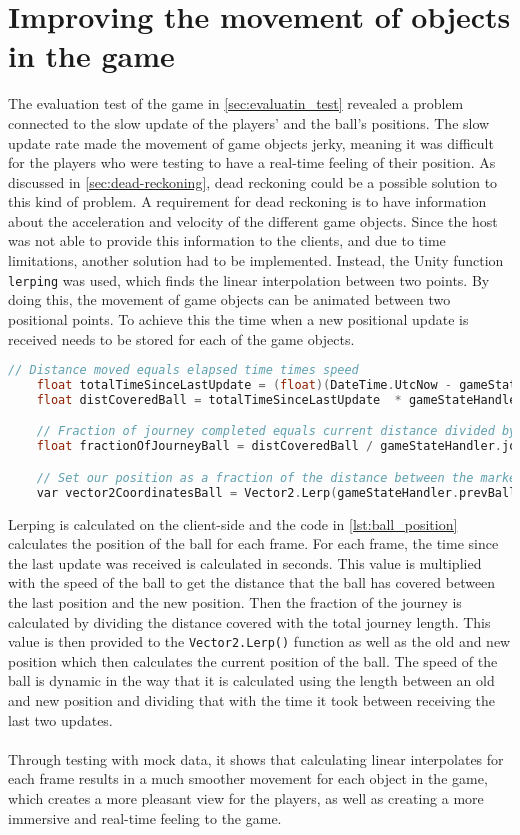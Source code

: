 \section{Improving the movement of objects in the game}\label{sec:lerping}
The evaluation test of the game in \autoref{sec:evaluatin_test} revealed a problem connected to the slow update of the players' and the ball's positions.
The slow update rate made the movement of game objects jerky, meaning it was difficult for the players who were testing to have a real-time feeling of their position.
As discussed in \autoref{sec:dead-reckoning}, dead reckoning could be a possible solution to this kind of problem.
A requirement for dead reckoning is to have information about the acceleration and velocity of the different game objects.
Since the host was not able to provide this information to the clients, and due to time limitations, another solution had to be implemented.
Instead, the Unity function \texttt{lerping} was used, which finds the linear interpolation between two points.
By doing this, the movement of game objects can be animated between two positional points.
To achieve this the time when a new positional update is received needs to be stored for each of the game objects.
\begin{lstlisting}[caption={Calculating the position of the ball}, captionpos=b,language=C,label={lst:ball_position}]
    // Distance moved equals elapsed time times speed
    float totalTimeSinceLastUpdate = (float)(DateTime.UtcNow - gameStateHandler.timeAtLastUpdateBall).TotalSeconds;
    float distCoveredBall = totalTimeSinceLastUpdate  * gameStateHandler.ballSpeed;

    // Fraction of journey completed equals current distance divided by total distance.
    float fractionOfJourneyBall = distCoveredBall / gameStateHandler.journeyLengthBall;

    // Set our position as a fraction of the distance between the markers.
    var vector2CoordinatesBall = Vector2.Lerp(gameStateHandler.prevBallPosition, gameStateHandler.newBallPosition, fractionOfJourneyBall);
\end{lstlisting}
Lerping is calculated on the client-side and the code in \autoref{lst:ball_position} calculates the position of the ball for each frame.
For each frame, the time since the last update was received is calculated in seconds.
This value is multiplied with the speed of the ball to get the distance that the ball has covered between the last position and the new position.
Then the fraction of the journey is calculated by dividing the distance covered with the total journey length.
This value is then provided to the \texttt{Vector2.Lerp()} function as well as the old and new position which then calculates the current position of the ball.
The speed of the ball is dynamic in the way that it is calculated using the length between an old and new position and dividing that with the time it took between receiving the last two updates.
\\\\
Through testing with mock data, it shows that calculating linear interpolates for each frame results in a much smoother movement for each object in the game, which creates a more pleasant view for the players, as well as creating a more immersive and real-time feeling to the game.
